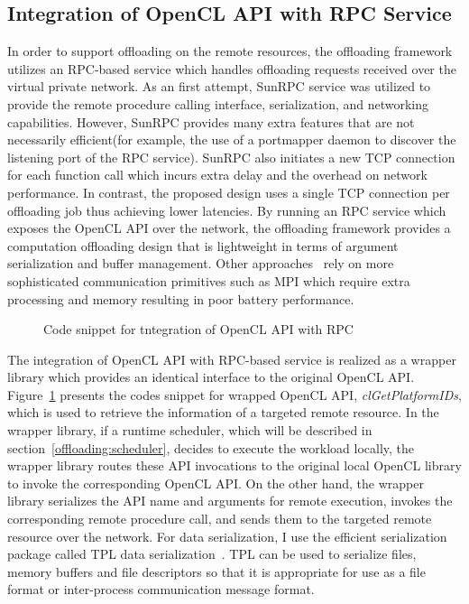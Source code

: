 \subsection{Integration of OpenCL API with RPC Service}
\label{offloading:rpc}
%
In order to support offloading on the remote resources, the offloading
framework utilizes an RPC-based service which handles offloading
requests received over the virtual private network.
%
As an first attempt, SunRPC service was utilized to provide the remote
procedure calling interface, serialization, and networking capabilities.
%
However, SunRPC provides many extra features that are not necessarily
efficient(for example, the use of a portmapper daemon to discover the
listening port of the RPC service).
%
SunRPC also initiates a new TCP connection for each function call which
incurs extra delay and the overhead on network performance.
%
In contrast, the proposed design uses a single TCP connection per
offloading job thus achieving lower latencies.
%
By running an RPC service which exposes the OpenCL API over the network,
the offloading framework provides a computation offloading design that
is lightweight in terms of argument serialization and buffer management.
%
Other approaches~\cite{vocl} rely on more sophisticated communication
primitives such as MPI which require extra processing and memory
resulting in poor battery performance.\\
%
\begin{figure}
\centering
{}
\caption{Code snippet for tntegration of OpenCL API with RPC}
\label{fig:code_rpc}
\end{figure}
%
The integration of OpenCL API with RPC-based service is realized as a
wrapper library which provides an identical interface to the original
OpenCL API.
%
Figure~\ref{fig:code_rpc} presents the codes snippet for wrapped
OpenCL API, {\it{clGetPlatformIDs}}, which is used to retrieve the
information of a targeted remote resource.
%
In the wrapper library, if a runtime scheduler, which will be described
in section~\ref{offloading:scheduler}, decides to execute the workload
locally, the wrapper library routes these API invocations to the original
local OpenCL library to invoke the corresponding OpenCL API.
%
On the other hand, the wrapper library serializes the API name and
arguments for remote execution, invokes the corresponding remote procedure
call, and sends them to the targeted remote resource over the network.
%
For data serialization, I use the efficient serialization package called
TPL data serialization~\cite{tpl}.
%
TPL can be used to serialize files, memory buffers and file descriptors
so that it is appropriate for use as a file format or inter-process
communication message format.
%

